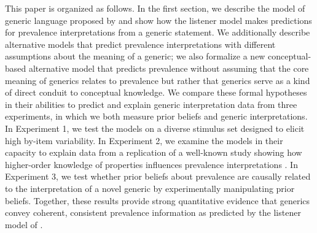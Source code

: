 \documentclass[floatsintext,man]{apa6}
\newcommand{\ndg}[1]{{\textcolor{Green}{[ndg: #1]}}}
\begin{document}
This paper is organized as follows.
In the first section, we describe the model of generic language proposed by  and show how the listener model makes predictions for prevalence interpretations from a generic statement.
We additionally describe alternative models that predict prevalence interpretations with different assumptions about the meaning of a generic; we also formalize a new conceptual-based alternative model that predicts prevalence without assuming that the core meaning of generics relates to prevalence but rather that generics serve as a kind of direct conduit to conceptual knowledge.
We compare these formal hypotheses in their abilities to predict and explain generic interpretation data from three experiments, in which we both measure prior beliefs and generic interpretations.
In Experiment 1, we test the models on a diverse stimulus set designed to elicit high by-item variability.
In Experiment 2, we examine the models in their capacity to explain data from a replication of a well-known study showing how higher-order knowledge of properties influences prevalence interpretations \cite{Cimpian2010}.
In Experiment 3, we test whether prior beliefs about prevalence are causally related to the interpretation of a novel generic by experimentally manipulating prior beliefs.
Together, these results provide strong quantitative evidence that generics convey coherent, consistent prevalence information as predicted by the listener model of .



\end{document}
